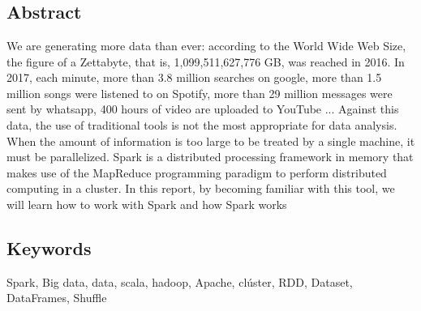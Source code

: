 \chapter*{}

\section*{Abstract}

We are generating more data than ever: according to the World Wide Web Size, the figure of a Zettabyte, that is, 1,099,511,627,776 GB, was reached in 2016. In 2017, each minute, more than 3.8 million searches on google, more than 1.5 million songs were listened to on Spotify, more than 29 million messages were sent by whatsapp, 400 hours of video are uploaded to YouTube ... Against this data, the use of traditional tools is not the most appropriate for data analysis.\\

When the amount of information is too large to be treated by a single machine, it must be parallelized. Spark is a distributed processing framework in memory that makes use of the MapReduce programming paradigm to perform distributed computing in a cluster. In this report, by becoming familiar with this tool, we will learn how to work with Spark and how Spark works

{\setlength{\parskip}{30mm}
\section*{Keywords}
}
Spark, Big data, data, scala, hadoop, Apache, clúster, RDD, Dataset, DataFrames, Shuffle